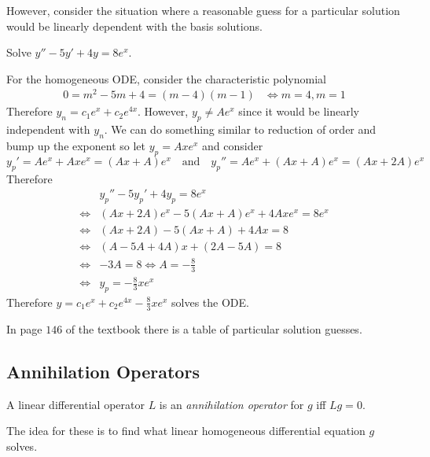\documentclass[notes]{subfiles}
\begin{document}
However, consider the situation where a reasonable guess for a particular solution would be linearly dependent with the basis solutions.

\begin{exercise} \label{linearly_dep_part_sol}
    Solve $y'' - 5y' + 4y = 8e^x$.
\end{exercise}
\begin{solution}
    For the homogeneous ODE, consider the characteristic polynomial
    \begin{align*}
        0 = m^2 - 5m + 4 = (m - 4)(m - 1)
        &\iff m = 4, m = 1
    \end{align*}
    Therefore $y_n = c_1e^x + c_2e^{4x}$.
    However, $y_p \neq Ae^x$ since it would be linearly independent with $y_n$. We can do something similar to reduction of order and bump up the exponent so let $y_p = Axe^x$ and consider
    \[
        y_p' = Ae^x + Axe^x = (Ax + A)e^x \quad \text{and} \quad y_p'' = Ae^x + (Ax + A)e^x = (Ax + 2A)e^x
    \]
    Therefore
    \begin{align*}
        &y_p'' - 5y_p' + 4y_p = 8e^x \\
        \iff& (Ax + 2A)e^x - 5(Ax + A)e^x + 4Axe^x = 8e^x \\
        \iff& (Ax + 2A) - 5(Ax + A) + 4Ax = 8 \\
        \iff& (A - 5A + 4A)x + (2A - 5A) = 8 \\
        \iff& -3A = 8 \iff A = -\frac{8}{3} \\
        \iff& y_p = -\frac{8}{3}xe^x
    \end{align*}
    Therefore $y = c_1e^x + c_2e^{4x} - \frac{8}{3}xe^x$ solves the ODE.
\end{solution}

In page $146$ of the textbook there is a table of particular solution guesses.

\subsection{Annihilation Operators}

\begin{definition}
    A linear differential operator $L$ is an \textit{annihilation operator} for $g$ iff $Lg = 0$. 
\end{definition}

The idea for these is to find what linear homogeneous differential equation $g$ solves.
\end{document}
